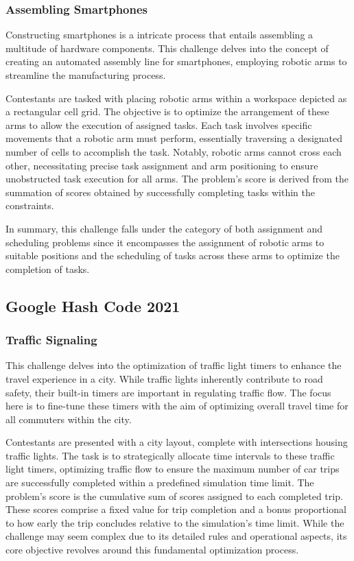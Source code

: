\subsubsection*{Assembling Smartphones}
\label{subsubsec:hashcode-2020-final}

Constructing smartphones is a intricate process that entails assembling a
multitude of hardware components. This challenge delves into the concept of
creating an automated assembly line for smartphones, employing robotic arms to
streamline the manufacturing process.

Contestants are tasked with placing robotic arms within a workspace depicted as
a rectangular cell grid. The objective is to optimize the arrangement of these
arms to allow the execution of assigned tasks. Each task involves specific
movements that a robotic arm must perform, essentially traversing a designated
number of cells to accomplish the task. Notably, robotic arms cannot cross each
other, necessitating precise task assignment and arm positioning to ensure
unobstructed task execution for all arms. The problem's score is derived from
the summation of scores obtained by successfully completing tasks within the
constraints.

In summary, this challenge falls under the category of both assignment and
scheduling problems since it encompasses the assignment of robotic arms to
suitable positions and the scheduling of tasks across these arms to optimize the
completion of tasks.

\subsection{Google Hash Code 2021}
\label{subsec:hashcode-2021}

\subsubsection*{Traffic Signaling}
\label{subsubsec:hashcode-2021-qualification}

This challenge delves into the optimization of traffic light timers to enhance
the travel experience in a city. While traffic lights inherently contribute to
road safety, their built-in timers are important in regulating traffic flow. The
focus here is to fine-tune these timers with the aim of optimizing overall
travel time for all commuters within the city.

Contestants are presented with a city layout, complete with intersections
housing traffic lights. The task is to strategically allocate time intervals to
these traffic light timers, optimizing traffic flow to ensure the maximum number
of car trips are successfully completed within a predefined simulation time
limit. The problem's score is the cumulative sum of scores assigned to each
completed trip. These scores comprise a fixed value for trip completion and a
bonus proportional to how early the trip concludes relative to the simulation's
time limit. While the challenge may seem complex due to its detailed rules and
operational aspects, its core objective revolves around this fundamental
optimization process.

